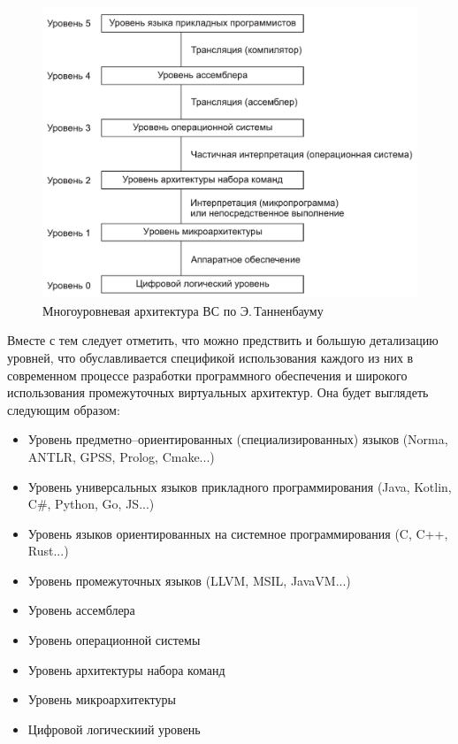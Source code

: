 \begin{figure}[htbp]
  \centering
  \includegraphics[width=1.0\textwidth]{img/base-02.png}
  \caption{Многоуровневая архитектура ВС по Э.\,Танненбауму}
  \label{base-02}
\end{figure}

Вместе с тем следует отметить, что можно предствить и большую детализацию уровней, что обуславливается спецификой использования каждого из них в современном процессе разработки программного обеспечения и широкого использования промежуточных виртуальных архитектур. Она будет выглядеть следующим образом:

\begin{itemize}
    \item Уровень предметно--ориентированных (специализированных) языков (Norma, ANTLR, GPSS, Prolog, Cmake...)
    \item Уровень универсальных языков прикладного программирования (Java, Kotlin, C\#, Python, Go, JS...)
    \item Уровень языков ориентированных на системное программирования (C, C++, Rust...)
    \item Уровень промежуточных языков (LLVM, MSIL, JavaVM...)
    \item Уровень ассемблера
    \item Уровень операционной системы
    \item Уровень архитектуры набора команд
    \item Уровень микроархитектуры
    \item Цифровой логическиий уровень
\end{itemize}

